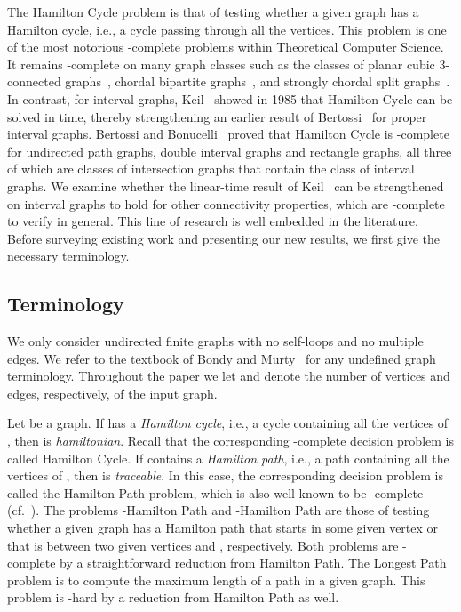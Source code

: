 \documentclass{llncs}
\begin{document}
The {\sc Hamilton Cycle} problem is that of 
testing whether a given graph has a Hamilton cycle, i.e., a cycle passing through all the vertices.
This problem
 is one of the most notorious -complete problems within Theoretical Computer Science.
It remains -complete on many graph classes such as the classes of planar cubic 3-connected graphs~\cite{GJT76},
chordal bipartite graphs~\cite{Mu96},  and strongly chordal split graphs~\cite{Mu96}. In contrast, for interval graphs, Keil~\cite{Ke85} showed in 1985 that {\sc Hamilton Cycle} can be solved in  time, thereby
strengthening an earlier result of Bertossi~\cite{Be83} for proper interval graphs.
Bertossi and Bonucelli~\cite{BB86} proved that {\sc Hamilton Cycle} is -complete for undirected path graphs, double interval graphs and rectangle graphs, all three of which are classes of intersection graphs that contain the class of interval graphs.
We examine whether the linear-time result of Keil~\cite{Ke85}  can be strengthened on interval graphs to hold for other connectivity properties, which are -complete to verify in general.
This line of research is well embedded in the literature. 
Before surveying existing work and presenting our new results, we first give the necessary terminology.

\subsection{Terminology}\label{s-term}

We only consider undirected finite graphs with no self-loops and no multiple edges. We refer to the textbook of Bondy and Murty~\cite{BM08} for any undefined graph terminology.
Throughout the paper we let  and  denote the number of vertices and edges, respectively, of the input graph.

Let  be a graph. If  has a {\em Hamilton cycle\/}, i.e., a cycle containing all the vertices of , then  is  {\em hamiltonian}.
Recall that the corresponding -complete decision problem is called {\sc Hamilton Cycle}.
If  contains a {\em Hamilton path}, i.e., a path containing all the vertices of , then  is  {\em traceable}. In this case, the corresponding decision problem is called the {\sc Hamilton Path} problem,
which is also well known to be -complete (cf.~\cite{GJ79}).
The problems {-Hamilton Path} and {-Hamilton Path} are those of testing whether a given graph has a Hamilton path that starts in some given vertex  or that is between two given vertices  and , respectively. Both problems are -complete by a straightforward reduction from {\sc Hamilton Path}. The {\sc Longest Path} problem is to compute the maximum length
of a path in a given graph. This problem is -hard by a reduction from {\sc Hamilton Path} as well.
\end{document}
